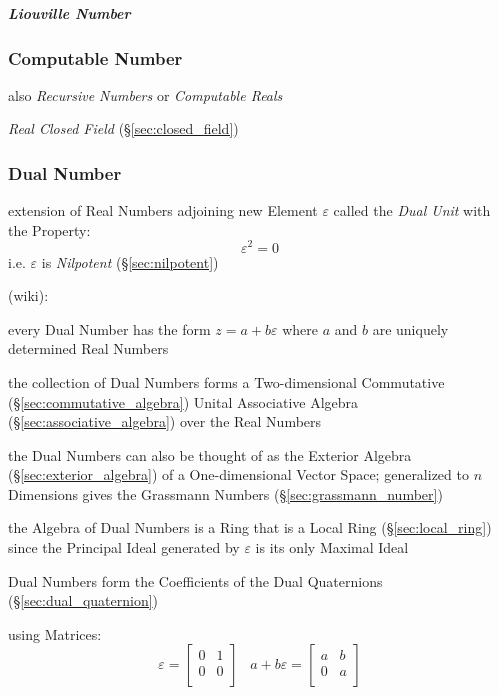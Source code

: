 \subparagraph{Liouville Number}\label{sec:liouville_number}\hfill



\subsubsection{Computable Number}\label{sec:computable_real}

also \emph{Recursive Numbers} or \emph{Computable Reals}

\emph{Real Closed Field} (\S\ref{sec:closed_field})



\subsubsection{Dual Number}\label{sec:dual_number}

extension of Real Numbers adjoining new Element $\varepsilon$ called the
\emph{Dual Unit} with the Property:
\[
  \varepsilon^2 = 0
\]
i.e. $\varepsilon$ is \emph{Nilpotent} (\S\ref{sec:nilpotent})

(wiki):

every Dual Number has the form $z = a + b\varepsilon$ where $a$ and $b$ are
uniquely determined Real Numbers

the collection of Dual Numbers forms a Two-dimensional Commutative
(\S\ref{sec:commutative_algebra}) Unital Associative Algebra
(\S\ref{sec:associative_algebra}) over the Real Numbers

the Dual Numbers can also be thought of as the Exterior Algebra
(\S\ref{sec:exterior_algebra}) of a One-dimensional Vector Space; generalized to
$n$ Dimensions gives the Grassmann Numbers (\S\ref{sec:grassmann_number})

the Algebra of Dual Numbers is a Ring that is a Local Ring
(\S\ref{sec:local_ring}) since the Principal Ideal generated by $\varepsilon$ is
its only Maximal Ideal

Dual Numbers form the Coefficients of the Dual Quaternions
(\S\ref{sec:dual_quaternion})

using Matrices:
\[
  \varepsilon = \begin{bmatrix}
    0 & 1 \\
    0 & 0 \\
  \end{bmatrix}
  \;\;\;
  a + b\varepsilon = \begin{bmatrix}
    a & b \\
    0 & a \\
  \end{bmatrix}
\]

